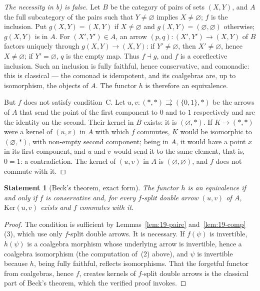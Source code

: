 \documentclass[11pt]{article}
\theoremstyle{plain}
\newtheorem*{enonce}{Statement}
\theoremstyle{definition}
\theoremstyle{remark}
\begin{document}
\begin{proof}[The necessity in b) is false]
Let $B$ be the category of pairs of sets $(X, Y)$, and $A$ the full subcategory of the pairs such that $Y \neq \varnothing$ implies $X \neq \varnothing$; $f$ is the inclusion. Put $g(X, Y) = (X, Y)$ if $X \neq \varnothing$ and $g(X, Y) = (\varnothing, \varnothing)$ otherwise; $g(X, Y)$ is in $A$. For $(X', Y') \in A$, an arrow $(p, q) : (X', Y') \to (X, Y)$ of $B$ factors uniquely through $g(X, Y) \to (X, Y)$: if $Y' \neq \varnothing$, then $X' \neq \varnothing$, hence $X \neq \varnothing$; if $Y' = \varnothing$, $q$ is the empty map. Thus $f \dashv g$, and $f$ is a coreflective inclusion. Such an inclusion is fully faithful, hence conservative, and comonadic: this is classical --- the comonad is idempotent, and its coalgebras are, up to isomorphism, the objects of $A$. The functor $h$ is therefore an equivalence.

But $f$ does not satisfy condition~C. Let $u, v : (\ast, \ast) \rightrightarrows (\{0, 1\}, \ast)$ be the arrows of $A$ that send the point of the first component to $0$ and to $1$ respectively and are the identity on the second. Their kernel in $B$ exists: it is $(\varnothing, \ast)$. If $K \to (\ast, \ast)$ were a kernel of $(u, v)$ in $A$ with which $f$ commutes, $K$ would be isomorphic to $(\varnothing, \ast)$, with non-empty second component; being in $A$, it would have a point $x$ in its first component, and $u$ and $v$ would send it to the same element, that is, $0 = 1$: a contradiction. The kernel of $(u, v)$ in $A$ is $(\varnothing, \varnothing)$, and $f$ does not commute with it.
\end{proof}

\begin{enonce}[Beck's theorem, exact form]
The functor $h$ is an equivalence if and only if $f$ is conservative and, for every $f$-split double arrow $(u, v)$ of $A$, $\mathrm{Ker}(u, v)$ exists and $f$ commutes with it.
\end{enonce}

\begin{proof}
The condition is sufficient by Lemmas~\ref{lem:19-paire} and~\ref{lem:19-comp}\,(3), which use only $f$-split double arrows. It is necessary. If $f(\psi)$ is invertible, $h(\psi)$ is a coalgebra morphism whose underlying arrow is invertible, hence a coalgebra isomorphism (the computation of~(2) above), and $\psi$ is invertible because $h$, being fully faithful, reflects isomorphisms. That the forgetful functor from coalgebras, hence $f$, creates kernels of $f$-split double arrows is the classical part of Beck's theorem, which the verified proof invokes.
\end{proof}
\end{document}
